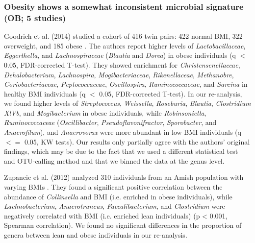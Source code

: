 \subsubsection{Obesity shows a somewhat inconsistent microbial signature (OB; 5 studies)}

Goodrich et al. (2014) studied a cohort of 416 twin pairs: 422 normal BMI, 322 overweight, and 185 obese \cite{ob-goodrich}.
The authors report higher levels of \textit{Lactobacillaceae}, \textit{Eggerthella}, and \textit{Lachnospiraceae} (\textit{Blautia} and \textit{Dorea}) in obese individuals (q $<$ 0.05, FDR-corrected T-test).
They showed enrichment for \textit{Christensenellaceae}, \textit{Dehalobacterium}, \textit{Lachnospira}, \textit{Mogibacteriaceae}, \textit{Rikenellaceae}, \textit{Methanobre}, \textit{Coriobacteriaceae}, \textit{Peptococcaceae}, \textit{Oscillospira}, \textit{Ruminococcaceae}, and \textit{Sarcina} in healthy BMI individuals (q $<$ 0.05, FDR-corrected T-test).
In our re-analysis, we found higher levels of \textit{Streptococcus}, \textit{Weissella}, \textit{Roseburia}, \textit{Blautia}, \textit{Clostridium XlVb}, and \textit{Mogibacterium} in obese individuals, while \textit{Robinsoniella}, \textit{Ruminococcaceae} (\textit{Oscillibacter}, \textit{Pseudoflavonifractor}, \textit{Sporobacter}, and \textit{Anaerofilum}), and \textit{Anaerovorax} were more abundant in low-BMI individuals (q $<=$ 0.05, KW tests).
Our results only partially agree with the authors' original findings, which may be due to the fact that we used a different statistical test and OTU-calling method and that we binned the data at the genus level.

Zupancic et al. (2012) analyzed 310 individuals from an Amish population with varying BMIs \cite{ob-zupancic}.
They found a significant positive correlation between the abundance of \textit{Collinsella} and BMI (i.e. enriched in obese individuals), while \textit{Lachnobacterium}, \textit{Anaerotruncus}, \textit{Faecalibacterium}, and \textit{Clostridium} were negatively correlated with BMI (i.e. enriched lean individuals) (p < 0.001, Spearman correlation).
We found no significant differences in the proportion of genera between lean and obese individuals in our re-analysis.

